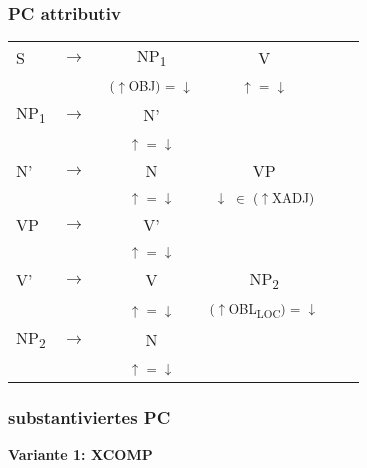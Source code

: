 \documentclass[12pt,a4paper]{article}
\begin{document}
\subsubsection{PC attributiv}


\begin{singlespace}
\begin{tabular}{ l  l  c  c  c  c }
  S & $\rightarrow$ & NP\textsubscript{1} & V\\
   & $\qquad$ & \textsuperscript{($\uparrow$OBJ) = $\downarrow$} & \textsuperscript{$\uparrow$ = $\downarrow$} \\
    NP\textsubscript{1} & $\rightarrow$ & N' \\
   & $\qquad$ & \textsuperscript{$\uparrow$ = $\downarrow$} \\
       N' & $\rightarrow$ & N & VP \\
   & $\qquad$ & \textsuperscript{$\uparrow$ = $\downarrow$} & \textsuperscript{$\downarrow$ $\in$ ($\uparrow$XADJ)} \\
		    VP & $\rightarrow$ & V' \\
   & $\qquad$ & \textsuperscript{$\uparrow$ = $\downarrow$} \\
  				  V' & $\rightarrow$ & V & NP\textsubscript{2} \\
   & $\qquad$ & \textsuperscript{$\uparrow$ = $\downarrow$} & \textsuperscript{($\uparrow$OBL\textsubscript{LOC}) = $\downarrow$ }  \\
   					 NP\textsubscript{2} & $\rightarrow$ & N \\
   & $\qquad$ & \textsuperscript{$\uparrow$ = $\downarrow$} \\
\end{tabular} 
\end{singlespace}

\subsubsection{substantiviertes PC}
\textbf{Variante 1: XCOMP}
\end{document}
